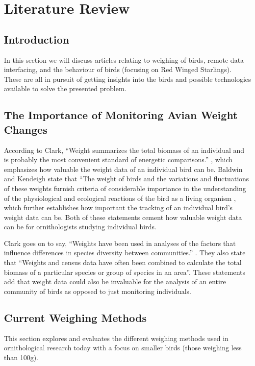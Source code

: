 \documentclass[class=report,11pt,crop=false]{standalone}
\begin{document}
\ifstandalone
\tableofcontents
\fi
\chapter{Literature Review \label{ch:literature}}
\vspace{0.5cm}

\section{Introduction}
In this section we will discuss articles relating to weighing of birds, remote data interfacing, and the behaviour of birds (focusing on Red Winged Starlings). These are all in pursuit of getting insights into the birds and possible technologies available to solve the presented problem.

\section{The Importance of Monitoring Avian Weight Changes}
According to Clark, “Weight summarizes the total biomass of an individual and is probably the most convenient standard of energetic comparisons.” \cite{ClarckWeights}, which emphasizes how valuable the weight data of an individual bird can be. Baldwin and Kendeigh state that “The weight of birds and the variations and fluctuations of these weights furnish criteria of considerable importance in the understanding of the physiological and ecological reactions of the bird as a living organism \cite{BaldwinWeights}, which further establishes how important the tracking of an individual bird’s weight data can be. Both of these statements cement how valuable weight data can be for ornithologists studying individual birds.

Clark goes on to say, “Weights have been used in analyses of the factors that influence differences in species diversity between communities.” \cite{ClarckWeights}. They also state that “Weights and census data have often been combined to calculate the total biomass of a particular species or group of species in an area”. These statements add that weight data could also be invaluable for the analysis of an entire community of birds as opposed to just monitoring individuals.

\section{Current Weighing Methods}
This section explores and evaluates the different weighing methods used in ornithological research today with a focus on smaller birds (those weighing less than 100g).
\end{document}
